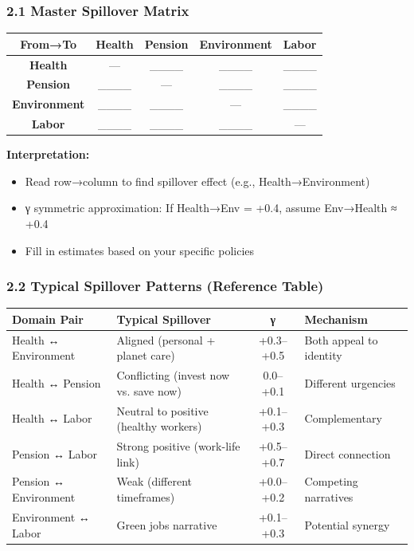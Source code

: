 \subsubsection*{2.1 Master Spillover Matrix}

\begin{center}
\renewcommand{\arraystretch}{1.8}
\begin{tabular}{@{}c|cccc@{}}
\toprule
\textbf{From→To} & \textbf{Health} & \textbf{Pension} & \textbf{Environment} & \textbf{Labor} \\
\midrule
\textbf{Health} & — & \_\_\_\_ & \_\_\_\_ & \_\_\_\_ \\
\textbf{Pension} & \_\_\_\_ & — & \_\_\_\_ & \_\_\_\_ \\
\textbf{Environment} & \_\_\_\_ & \_\_\_\_ & — & \_\_\_\_ \\
\textbf{Labor} & \_\_\_\_ & \_\_\_\_ & \_\_\_\_ & — \\
\midrule
\end{tabular}
\end{center}

\textbf{Interpretation:}
\begin{itemize}[nosep]
\item Read row→column to find spillover effect (e.g., Health→Environment)
\item γ symmetric approximation: If Health→Env = +0.4, assume Env→Health ≈ +0.4
\item Fill in estimates based on your specific policies
\end{itemize}

\subsubsection*{2.2 Typical Spillover Patterns (Reference Table)}

\begin{center}
\small
\begin{tabular}{@{}llcl@{}}
\toprule
\textbf{Domain Pair} & \textbf{Typical Spillover} & \textbf{γ} & \textbf{Mechanism} \\
\midrule
Health ↔ Environment & Aligned (personal + planet care) & +0.3–+0.5 & Both appeal to identity \\
Health ↔ Pension & Conflicting (invest now vs. save now) & 0.0–+0.1 & Different urgencies \\
Health ↔ Labor & Neutral to positive (healthy workers) & +0.1–+0.3 & Complementary \\
Pension ↔ Labor & Strong positive (work-life link) & +0.5–+0.7 & Direct connection \\
Pension ↔ Environment & Weak (different timeframes) & +0.0–+0.2 & Competing narratives \\
Environment ↔ Labor & Green jobs narrative & +0.1–+0.3 & Potential synergy \\
\midrule
\end{tabular}
\end{center}

